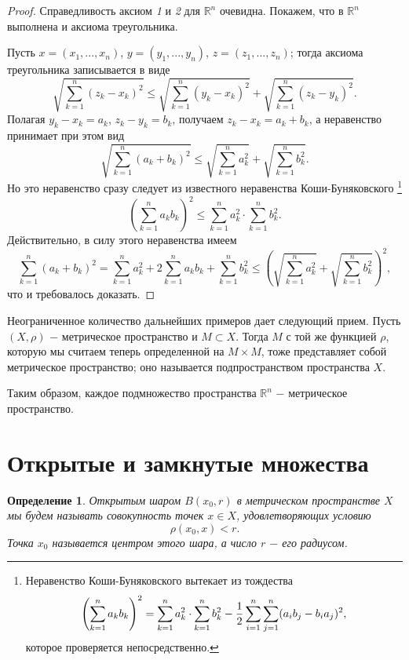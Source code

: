\documentclass{article}
\newtheorem{definition}{Определение}[section]
\begin{document}
\begin{proof}
Справедливость аксиом \textit{1} и \textit{2} для \(\mathbb{R}^n\) очевидна. Покажем, что в \(\mathbb{R}^n\) выполнена и аксиома треугольника.

Пусть \(x = (x_1, ..., x_n)\), \(y = (y_1, ..., y_n)\), \(z = (z_1, ..., z_n)\); тогда аксиома треугольника записывается в виде
\[
\sqrt{\sum_{k = 1}^{n}(z_k - x_k)^2} \leq \sqrt{\sum_{k = 1}^{n}(y_k - x_k)^2} + \sqrt{\sum_{k = 1}^{n}(z_k - y_k)^2}.
\]
Полагая \(y_k - x_k = a_k\), \(z_k - y_k = b_k\), получаем \(z_k - x_k = a_k + b_k\), а неравенство принимает при этом вид
\[
\sqrt{\sum_{k = 1}^{n}(a_k + b_k)^2} \leq \sqrt{\sum_{k = 1}^{n}a_k^2} + \sqrt{\sum_{k = 1}^{n}b_k^2}.
\]
Но это неравенство сразу следует из известного неравенства Коши-Буняковского
\footnote{
Неравенство Коши-Буняковского вытекает из тождества
\[
\left(\sum_{k = 1}^{n}a_k{b_k}\right)^2 = \sum_{k = 1}^{n}a_k^2 \cdot \sum_{k = 1}^{n}b_k^2 - {1 \over 2}\sum_{i = 1}^{n}\sum_{j = 1}^{n}(a_ib_j - b_ia_j)^2,
\]
которое проверяется непосредственно.
}
\[
\left(\sum_{k = 1}^{n}a_k{b_k}\right)^2 \leq \sum_{k = 1}^{n}a_k^2 \cdot \sum_{k = 1}^{n}b_k^2.
\]
Действительно, в силу этого неравенства имеем
\[
\sum_{k = 1}^{n}(a_k + b_k)^2 = \sum_{k = 1}^{n}a_k^2 + 2 \sum_{k = 1}^{n}a_k{b_k} + \sum_{k = 1}^{n}b_k^2 \leq \left(\sqrt{\sum_{k = 1}^{n}a_k^2} + \sqrt{\sum_{k = 1}^{n}b_k^2}\right)^2,
\]
что и требовалось доказать.
\end{proof}

Неограниченное количество дальнейших примеров дает следующий прием. Пусть \((X, \rho)\) \(-\) метрическое пространство и \(M \subset X\). Тогда \(M\) с той же функцией \(\rho\), которую мы считаем теперь определенной на \(M \times M\), тоже представляет собой метрическое пространство; оно называется подпространством пространства \(X\).

Таким образом, каждое подмножество пространства \(\mathbb{R}^n\) \(-\) метрическое пространство.

\section{Открытые и замкнутые множества}

\begin{definition}
Открытым шаром \(B(x_0, r)\) в метрическом пространстве \(X\) мы будем называть совокупность точек \(x \in X\), удовлетворяющих условию
\[
\rho(x_0, x) < r.
\]
Точка \(x_0\) называется центром этого шара, а число \(r\) \(-\) его радиусом.
\end{definition}
\end{document}
